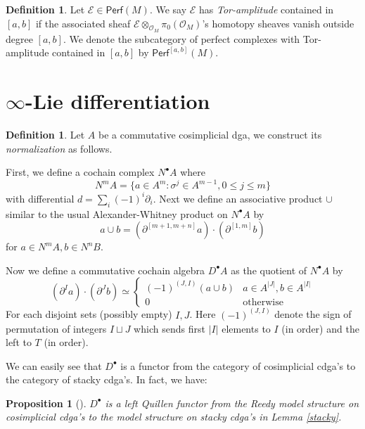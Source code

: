 \documentclass[12pt]{amsart}
\newtheorem{prop}[thm]{Proposition}
\theoremstyle{definition}
\newtheorem{defn}[thm]{Definition}
\theoremstyle{remark}
\numberwithin{equation}{section}
\newcommand{\del}{\partial}
\renewcommand{\del}{\partial}
\newcommand{\CO}{{\mathcal O}}
\newcommand{\1}{{\mathbb{1}}}
\newcommand{\E}{{\mathcal{E}}}
\newcommand{\perf}{\mathsf{Perf}}
\newcommand{\bt}{\bullet}
\begin{document}
\begin{defn}
    Let $\E \in \perf(M)$. We say $\E$ has {\it Tor-amplitude} contained in $[a,b]$ if the associated sheaf $\E\otimes_{\CO_M} \pi_0(\CO_M)$'s homotopy sheaves vanish outside degree $[a,b]$. We denote the subcategory of perfect complexes with Tor-amplitude contained in $[a, b]$ by $\perf^{[a,b]}(M)$.
\end{defn}
\section{$\infty$-Lie differentiation}
\begin{defn}
    Let $A$ be a commutative cosimplicial dga, we construct its {\it normalization} as follows.
    
    First, we define a cochain complex $N^{\bt} A$ where
    \begin{equation*}
        N^mA = \{ a\in A^m: \sigma^j \in A^{m-1}, 0\le j\le m\}
    \end{equation*}
    with differential $d = \sum_i (-1)^i\del_i$. Next we define an associative product $\cup$ similar to the usual Alexander-Whitney product on $N^{\bt} A$ by
    \begin{equation*}
        a \cup b = (\del^{[m+1, m+n]}a)\cdot (\del^{[1, m]} b)
    \end{equation*}
    for $a\in N^m A, b \in N^n B$.
    
    Now we define a commutative cochain algebra $D^{\bt} A$ as the quotient of $N^{\bt} A$ by
    \begin{equation*}
        (\del^I a) \cdot (\del^J b) \simeq\begin{cases}
         (-1)^{(J, I)}(a\cup b) & a\in A^{|J|}, b\in A^{|I|}\\
         0 &\text{otherwise}
        \end{cases}
    \end{equation*}
    For each disjoint sets (possibly empty) $I, J$. Here $(-1)^{(J, I)}$ denote the sign of permutation of integers $I\sqcup J$ which sends first $|I|$ elements to $I$ (in order) and the left to $T$ (in order).
    \end{defn}
    We can easily see that $D^{\bt}$ is a functor from the category of cosimplicial cdga's to the category of stacky cdga's. In fact, we have:
    \begin{prop}[\cite{Pri17, Lemma 3.5}]
        $D^{\bt}$ is a left Quillen functor from the Reedy model structure on cosimplicial cdga's to the model structure on stacky cdga's in Lemma \ref{stacky}.
    \end{prop}
    
\end{document}

